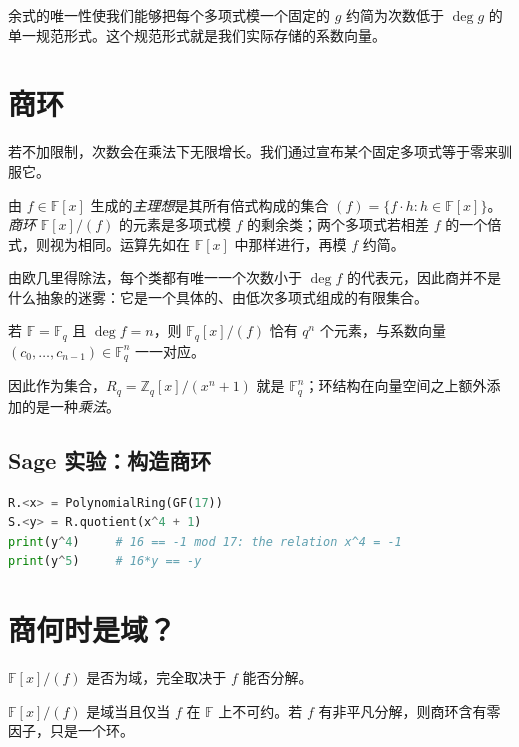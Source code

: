 余式的唯一性使我们能够把每个多项式模一个固定的 $g$ 约简为次数低于 $\deg g$ 的单一规范形式。这个规范形式就是我们实际存储的系数向量。

\section{商环}
若不加限制，次数会在乘法下无限增长。我们通过宣布某个固定多项式等于零来驯服它。

\begin{definition}[理想与商环]
由 $f\in\mathbb{F}[x]$ 生成的\emph{主理想}是其所有倍式构成的集合 $(f)=\{f\cdot h : h\in\mathbb{F}[x]\}$。\emph{商环} $\mathbb{F}[x]/(f)$ 的元素是多项式模 $f$ 的剩余类；两个多项式若相差 $f$ 的一个倍式，则视为相同。运算先如在 $\mathbb{F}[x]$ 中那样进行，再模 $f$ 约简。
\end{definition}

由欧几里得除法，每个类都有唯一一个次数小于 $\deg f$ 的代表元，因此商并不是什么抽象的迷雾：它是一个具体的、由低次多项式组成的有限集合。

\begin{proposition}[商的大小]
若 $\mathbb{F}=\mathbb{F}_q$ 且 $\deg f = n$，则 $\mathbb{F}_q[x]/(f)$ 恰有 $q^n$ 个元素，与系数向量 $(c_0,\dots,c_{n-1})\in\mathbb{F}_q^n$ 一一对应。
\end{proposition}

因此作为集合，$R_q=\mathbb{Z}_q[x]/(x^n+1)$ 就是 $\mathbb{F}_q^n$；环结构在向量空间之上额外添加的是一种\emph{乘法}。

\subsection{Sage 实验：构造商环}

\begin{lstlisting}[language=Python]
R.<x> = PolynomialRing(GF(17))
S.<y> = R.quotient(x^4 + 1)
print(y^4)     # 16 == -1 mod 17: the relation x^4 = -1
print(y^5)     # 16*y == -y
\end{lstlisting}

\section{商何时是域？}
$\mathbb{F}[x]/(f)$ 是否为域，完全取决于 $f$ 能否分解。

\begin{theorem}[不可约性与域]
$\mathbb{F}[x]/(f)$ 是域当且仅当 $f$ 在 $\mathbb{F}$ 上不可约。若 $f$ 有非平凡分解，则商环含有零因子，只是一个环。
\end{theorem}

